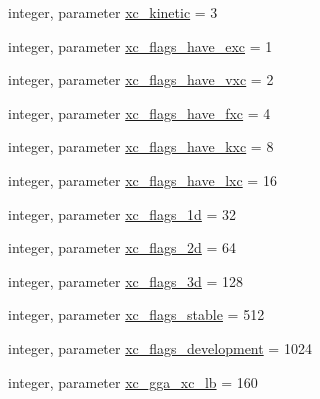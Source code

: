 \begin{DoxyCompactItemize}
\item 
integer, parameter \hyperlink{classxc__f90__lib__m_a583eff4a497d696e6234a409b548c9fa}{xc\-\_\-kinetic} = 3
\item 
integer, parameter \hyperlink{classxc__f90__lib__m_ae8565a0f068d7c2bcb71972ad9376880}{xc\-\_\-flags\-\_\-have\-\_\-exc} = 1
\item 
integer, parameter \hyperlink{classxc__f90__lib__m_a6b078d1aeb4f3c37b15423389e04f32f}{xc\-\_\-flags\-\_\-have\-\_\-vxc} = 2
\item 
integer, parameter \hyperlink{classxc__f90__lib__m_a5e04163eace7cb8903d86f7551bd4d55}{xc\-\_\-flags\-\_\-have\-\_\-fxc} = 4
\item 
integer, parameter \hyperlink{classxc__f90__lib__m_a0849c9a43947ca80608a1c305bf813bf}{xc\-\_\-flags\-\_\-have\-\_\-kxc} = 8
\item 
integer, parameter \hyperlink{classxc__f90__lib__m_ab10c4653daa1686e3bb0ed041fceaf34}{xc\-\_\-flags\-\_\-have\-\_\-lxc} = 16
\item 
integer, parameter \hyperlink{classxc__f90__lib__m_aef600ee15c663a94223a9cb7e7e9b144}{xc\-\_\-flags\-\_\-1d} = 32
\item 
integer, parameter \hyperlink{classxc__f90__lib__m_a053e8cbd3357101c4d558118a72a90ca}{xc\-\_\-flags\-\_\-2d} = 64
\item 
integer, parameter \hyperlink{classxc__f90__lib__m_a0e438b17e5b4f220f916fba0c191b331}{xc\-\_\-flags\-\_\-3d} = 128
\item 
integer, parameter \hyperlink{classxc__f90__lib__m_a4a87ea91849583b82deb63b42c4f8c3e}{xc\-\_\-flags\-\_\-stable} = 512
\item 
integer, parameter \hyperlink{classxc__f90__lib__m_a6ba6e34a3c1eeadcaac11e4fec716535}{xc\-\_\-flags\-\_\-development} = 1024
\item 
integer, parameter \hyperlink{classxc__f90__lib__m_a32cd4bce8e7a15f244e9186054154fc7}{xc\-\_\-gga\-\_\-xc\-\_\-lb} = 160
\end{DoxyCompactItemize}


